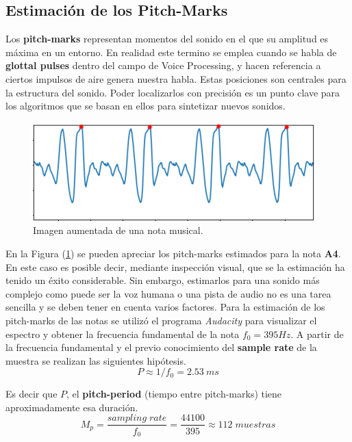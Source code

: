\subsection{Estimación de los Pitch-Marks}
Los \textbf{pitch-marks} representan momentos del sonido en el que su amplitud es máxima en un entorno. En realidad este termino se emplea cuando se habla de \textbf{glottal pulses} dentro del campo de Voice Processing, y hacen referencia a ciertos impulsos de aire genera nuestra habla.
Estas posiciones son centrales para la estructura del sonido. Poder localizarlos con precisión es un punto clave para los algoritmos que se basan en ellos para sintetizar nuevos sonidos.
\begin{figure}[H]
	\centering
	\includegraphics[width=0.7\linewidth]{ImagenesEjercicio5/soundZoomPMS.PNG}
	\caption{Imagen aumentada de una nota musical.}
	\label{fig:soundzoom}
\end{figure}

En la Figura (\ref{fig:soundzoom}) se pueden apreciar los pitch-marks estimados para la nota \textbf{A4}. En este caso es posible decir, mediante inspección visual, que se la estimación ha tenido un éxito considerable. Sin embargo, estimarlos para una sonido más complejo como puede ser la voz humana o una pista de audio no es una tarea sencilla y se deben tener en cuenta varios factores.
Para la estimación de los pitch-marks de las notas se utilizó el programa \textit{Audacity} para visualizar el espectro y obtener la frecuencia fundamental de la nota $f_0 = 395Hz$. A partir de la frecuencia fundamental y el previo conocimiento del \textbf{sample rate} de la muestra se realizan las siguientes hipótesis.
\begin{equation*}
	P \approx 1/f_0 = 2.53 \ ms
\end{equation*}	
	
Es decir que $P$, el \textbf{pitch-period} (tiempo entre pitch-marks) tiene aproximadamente esa duración. 
\begin{equation*}
	M_p = \frac{sampling\;rate}{f_0} = \frac{44100}{395} \approx 112\; muestras
\end{equation*}	


